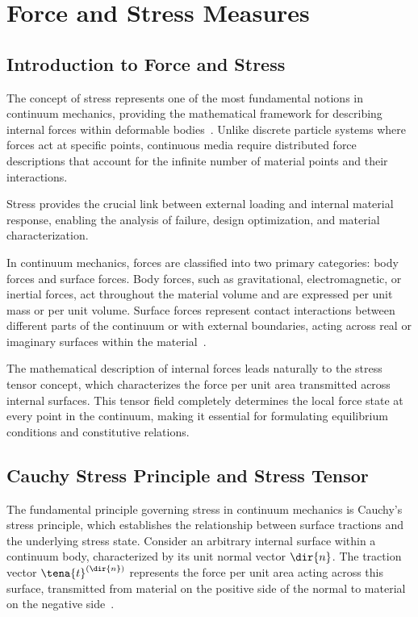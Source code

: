 \chapter{Force and Stress Measures}

\section{Introduction to Force and Stress}

The concept of stress represents one of the most fundamental notions in continuum mechanics, providing the mathematical framework for describing internal forces within deformable bodies~\autocite{Sadd.2019}. Unlike discrete particle systems where forces act at specific points, continuous media require distributed force descriptions that account for the infinite number of material points and their interactions.

\begin{keypoint}
Stress provides the crucial link between external loading and internal material response, enabling the analysis of failure, design optimization, and material characterization.
\end{keypoint}

In continuum mechanics, forces are classified into two primary categories: body forces and surface forces. Body forces, such as gravitational, electromagnetic, or inertial forces, act throughout the material volume and are expressed per unit mass or per unit volume. Surface forces represent contact interactions between different parts of the continuum or with external boundaries, acting across real or imaginary surfaces within the material~\autocite{Sadd.2019}.

The mathematical description of internal forces leads naturally to the stress tensor concept, which characterizes the force per unit area transmitted across internal surfaces. This tensor field completely determines the local force state at every point in the continuum, making it essential for formulating equilibrium conditions and constitutive relations.

\section{Cauchy Stress Principle and Stress Tensor}

The fundamental principle governing stress in continuum mechanics is Cauchy's stress principle, which establishes the relationship between surface tractions and the underlying stress state. Consider an arbitrary internal surface within a continuum body, characterized by its unit normal vector $\dir{n}$. The traction vector $\tena{t}^{(\dir{n})}$ represents the force per unit area acting across this surface, transmitted from material on the positive side of the normal to material on the negative side~\autocite{Sadd.2019}.

